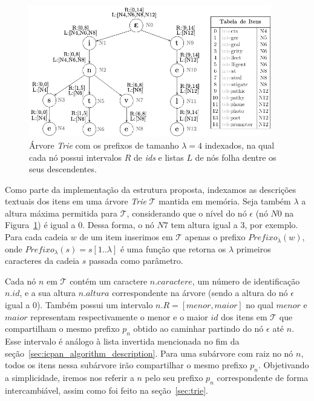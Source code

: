  
 \begin{figure} [ht]
    \centering
    \includegraphics[width=0.94\textwidth]{figures/index-structure.png}
    \caption{Árvore \textit{Trie} com os prefixos de tamanho $\lambda = 4$ indexados, na qual cada nó possui intervalos $R$ de \textit{ids} e listas $L$ de nós folha dentre os seus descendentes.}
    \label{fig:index_structure}
\end{figure}

 
Como parte da implementação da estrutura proposta, indexamos as descrições textuais dos itens em uma árvore \textit{Trie} $\mathcal{T}$ mantida em memória. Seja também $\lambda$ a altura máxima permitida para $\mathcal{T}$, considerando que o nível do nó $\epsilon$ (nó $N0$ na Figura~\ref{fig:index_structure}) é igual a $0$. Dessa forma, o nó $N7$ tem altura igual a $3$, por exemplo. Para cada cadeia $w$ de um item inserimos em $\mathcal{T}$ apenas o prefixo $Prefixo_{\lambda}(w)$, onde $Prefixo_{\lambda}(s) = s[1..\lambda]$ é uma função que retorna os $\lambda$ primeiros caracteres da cadeia $s$ passada como parâmetro.

Cada nó $n$ em $\mathcal{T}$ contém um caractere $n.caractere$, um número de identificação $n.id$, e a sua altura $n.altura$ correspondente na árvore (sendo a altura do nó $\epsilon$ igual a 0). Também possui um intervalo $n.R = [menor, maior]$ no qual $menor$ e $maior$ representam respectivamente o menor e o maior $id$ dos itens em $\mathcal{T}$ que compartilham o mesmo prefixo $p_{n}$ obtido ao caminhar partindo do nó $\epsilon$ até $n$. Esse intervalo é análogo à lista invertida mencionada no fim da seção~\ref{sec:icpan_algorithm_description}. Para uma subárvore com raiz no nó $n$, todos os itens nessa subárvore irão compartilhar o mesmo prefixo $p_{n}$. Objetivando a simplicidade, iremos nos referir a $n$ pelo seu prefixo $p_{n}$ correspondente de forma intercambiável, assim como foi feito na seção~\ref{sec:trie}. 

